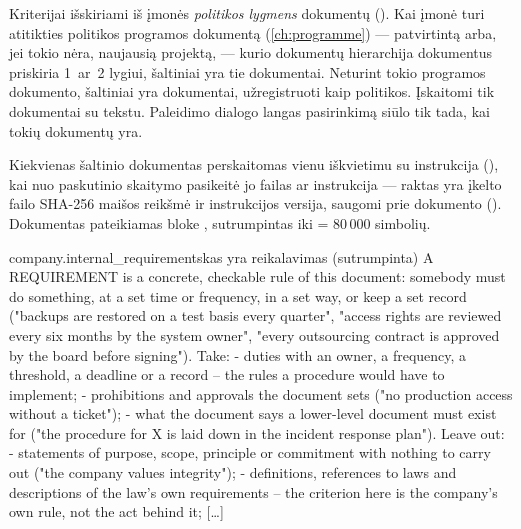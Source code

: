 Kriterijai išskiriami iš įmonės \emph{politikos lygmens} dokumentų ().
Kai įmonė turi atitikties politikos programos dokumentą (\cref{ch:programme}) --- patvirtintą
arba, jei tokio nėra, naujausią projektą, --- kurio dokumentų hierarchija dokumentus priskiria
1~ar~2 lygiui, šaltiniai yra tie dokumentai. Neturint tokio programos dokumento, šaltiniai yra
dokumentai, užregistruoti kaip politikos. Įskaitomi tik dokumentai su tekstu. Paleidimo dialogo
langas pasirinkimą siūlo tik tada, kai tokių dokumentų yra.

Kiekvienas šaltinio dokumentas perskaitomas vienu iškvietimu su instrukcija
 (), kai nuo paskutinio skaitymo
pasikeitė jo failas ar instrukcija --- raktas yra įkelto failo SHA-256 maišos reikšmė ir
instrukcijos versija,
saugomi prie dokumento (). Dokumentas pateikiamas bloke
, sutrumpintas iki  = 80\,000 simbolių.

\begin{promptexcerpt}{company.internal_requirements}{kas yra reikalavimas (sutrumpinta)}
  A REQUIREMENT is a concrete, checkable rule of this document: somebody must do something, at a set time or frequency, in a set way, or keep a set record ("backups are restored on a test basis every quarter", "access rights are reviewed every six months by the system owner", "every outsourcing contract is approved by the board before signing"). Take:
  - duties with an owner, a frequency, a threshold, a deadline or a record – the rules a procedure would have to implement;
  - prohibitions and approvals the document sets ("no production access without a ticket");
  - what the document says a lower-level document must exist for ("the procedure for X is laid down in the incident response plan").
  Leave out:
  - statements of purpose, scope, principle or commitment with nothing to carry out ("the company values integrity");
  - definitions, references to laws and descriptions of the law's own requirements – the criterion here is the company's own rule, not the act behind it;
[…]
\end{promptexcerpt}

